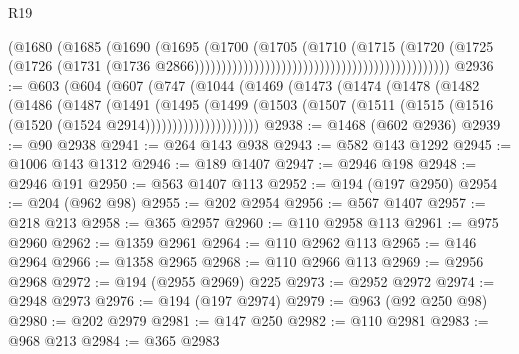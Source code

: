 \begin{lexlean}{R19}
\begin{coremodule}
                                                                        (@1680
                                                                          (@1685
                                                                            (@1690
                                                                              (@1695
                                                                                (@1700
                                                                                  (@1705
                                                                                    (@1710
                                                                                      (@1715
                                                                                        (@1720
                                                                                          (@1725
                                                                                            (@1726
                                                                                              (@1731
                                                                                                (@1736
                                                                                                  @2866)))))))))))))))))))))))))))))))))))))))))))))))
@2936 := @603
    (@604
      (@607
        (@747
          (@1044
            (@1469
              (@1473
                (@1474
                  (@1478
                    (@1482
                      (@1486
                        (@1487
                          (@1491
                            (@1495
                              (@1499
                                (@1503
                                  (@1507
                                    (@1511 (@1515 (@1516 (@1520 (@1524 @2914)))))))))))))))))))))
@2938 := @1468 (@602 @2936)
@2939 := @90 @2938
@2941 := @264 @143 @938
@2943 := @582 @143 @1292
@2945 := @1006 @143 @1312
@2946 := @189 @1407
@2947 := @2946 @198
@2948 := @2946 @191
@2950 := @563 @1407 @113
@2952 := @194 (@197 @2950)
@2954 := @204 (@962 @98)
@2955 := @202 @2954
@2956 := @567 @1407
@2957 := @218 @213
@2958 := @365 @2957
@2960 := @110 @2958 @113
@2961 := @975 @2960
@2962 := @1359 @2961
@2964 := @110 @2962 @113
@2965 := @146 @2964
@2966 := @1358 @2965
@2968 := @110 @2966 @113
@2969 := @2956 @2968
@2972 := @194 (@2955 @2969) @225
@2973 := @2952 @2972
@2974 := @2948 @2973
@2976 := @194 (@197 @2974)
@2979 := @963 (@92 @250 @98)
@2980 := @202 @2979
@2981 := @147 @250
@2982 := @110 @2981
@2983 := @968 @213
@2984 := @365 @2983

\end{coremodule}
\end{lexlean}
